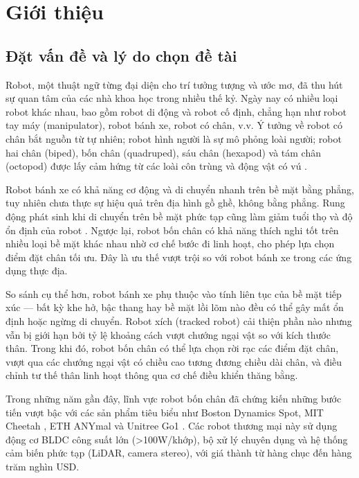 \chapter{Giới thiệu}

\section{Đặt vấn đề và lý do chọn đề tài}

Robot, một thuật ngữ từng đại diện cho trí tưởng tượng và ước mơ, đã thu hút sự quan tâm của các nhà khoa học trong nhiều thế kỷ. Ngày nay có nhiều loại robot khác nhau, bao gồm robot di động và robot cố định, chẳng hạn như robot tay máy (manipulator), robot bánh xe, robot có chân, v.v. Ý tưởng về robot có chân bắt nguồn từ tự nhiên; robot hình người là sự mô phỏng loài người; robot hai chân (biped), bốn chân (quadruped), sáu chân (hexapod) và tám chân (octopod) được lấy cảm hứng từ các loài côn trùng và động vật có vú \cite{raibert1986}.

Robot bánh xe có khả năng cơ động và di chuyển nhanh trên bề mặt bằng phẳng, tuy nhiên chưa thực sự hiệu quả trên địa hình gồ ghề, không bằng phẳng. Rung động phát sinh khi di chuyển trên bề mặt phức tạp cũng làm giảm tuổi thọ và độ ổn định của robot \cite{gonzalez2018}. Ngược lại, robot bốn chân có khả năng thích nghi tốt trên nhiều loại bề mặt khác nhau nhờ cơ chế bước đi linh hoạt, cho phép lựa chọn điểm đặt chân tối ưu. Đây là ưu thế vượt trội so với robot bánh xe trong các ứng dụng thực địa.

So sánh cụ thể hơn, robot bánh xe phụ thuộc vào tính liên tục của bề mặt tiếp xúc --- bất kỳ khe hở, bậc thang hay bề mặt lồi lõm nào đều có thể gây mất ổn định hoặc ngừng di chuyển. Robot xích (tracked robot) cải thiện phần nào nhưng vẫn bị giới hạn bởi tỷ lệ khoảng cách vượt chướng ngại vật so với kích thước thân. Trong khi đó, robot bốn chân có thể lựa chọn rời rạc các điểm đặt chân, vượt qua các chướng ngại vật có chiều cao tương đương chiều dài chân, và điều chỉnh tư thế thân linh hoạt thông qua cơ chế điều khiển thăng bằng.

Trong những năm gần đây, lĩnh vực robot bốn chân đã chứng kiến những bước tiến vượt bậc với các sản phẩm tiêu biểu như Boston Dynamics Spot, MIT Cheetah \cite{hyun2014, bledt2018}, ETH ANYmal \cite{hutter2016} và Unitree Go1 \cite{unitree2021}. Các robot thương mại này sử dụng động cơ BLDC công suất lớn (>100W/khớp), bộ xử lý chuyên dụng và hệ thống cảm biến phức tạp (LiDAR, camera stereo), với giá thành từ hàng chục đến hàng trăm nghìn USD.

